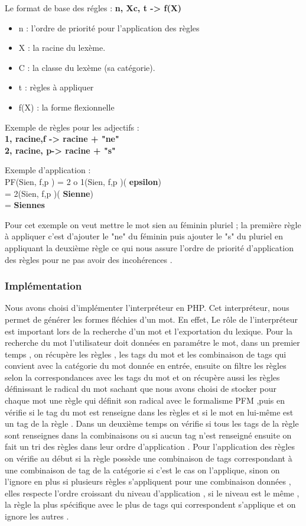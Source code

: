 \documentclass[12pt,a4paper]{article}
\begin{document}
      Le format de base des régles : \textbf{n, Xc, t -> f(X) } \\
\begin{itemize}
    \item n : l’ordre de priorité pour l’application des règles
    \item X : la racine du lexème.
    \item C : la classe du lexème (sa catégorie).
    \item t : règles à appliquer
    \item f(X) : la forme flexionnelle
\end{itemize}

Exemple de règles pour les adjectifs : \\
\textbf{1, racine,{f} -> racine + "ne"} \\
\textbf{2, racine, {p}-> racine + "s"}

Exemple d'application : \\
PF(Sien, {f,p} ) = 2 o 1(Sien, {f,p} )(\textbf{ epsilon}) \\
                 = 2(Sien, {f,p} )(\textbf{ Sienne}) \\
                 =\textbf{ Siennes }

Pour cet exemple on veut mettre le mot sien au féminin pluriel ; la première règle à appliquer c'est d'ajouter le "ne" du féminin puis ajouter le "s" du pluriel en appliquant la deuxième règle ce qui nous assure l'ordre de priorité d'application des règles pour ne pas avoir des incohérences .
\subsubsection{Implémentation}


Nous avons choisi d'implémenter l'interpréteur en PHP.
Cet interpréteur, nous permet de générer les formes fléchies d'un mot.
En effet, Le rôle de l'interpréteur est important lors de la recherche d'un mot et l'exportation du lexique.
Pour la recherche du mot l'utilisateur doit données en paramétre le mot, 
dans un premier temps , on récupère les règles , les tags du mot et les combinaison de tags qui convient avec la catégorie du mot donnée en entrée, ensuite on filtre les règles selon la correspondances avec les tags du mot et on récupère aussi les règles définissant le radical du mot sachant que nous avons choisi de stocker pour chaque mot une règle qui définit son radical avec le formalisme PFM ,puis en vérifie si le tag du mot est renseigne dans les règles et si le mot en lui-même est un tag de la règle . 
Dans un deuxième temps on vérifie si tous les tags de la règle sont renseignes dans la combinaisons ou si aucun tag n'est renseigné ensuite on fait un tri des règles dans leur ordre d'application .
Pour l'application des règles on vérifie au début si la règle possède une combinaison de tags correspondant à une combinaison de tag de la catégorie si c'est le cas on l'applique, sinon on l'ignore en plus si plusieurs règles s'appliquent pour une combinaison données , elles respecte l'ordre croissant du niveau d'application , si le niveau est le même , la règle la plus spécifique avec le plus de tags qui correspondent s'applique et on ignore les autres .
\end{document}
